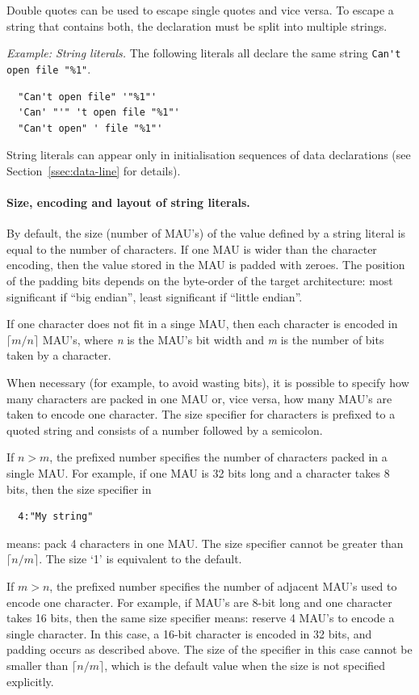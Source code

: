 \documentclass[twoside]{tceusermanual}
\begin{document}
Double quotes can be used to escape single quotes and vice versa. To escape
a string that contains both, the declaration must be split into multiple
strings.

\emph{Example: String literals.}
The following literals all declare the same string 
\verb|Can't open file "%1"|.
%
\begin{verbatim}
  "Can't open file" '"%1"'
  'Can' "'" 't open file "%1"'
  "Can't open" ' file "%1"'
\end{verbatim}

String literals can appear only in initialisation sequences of data
declarations (see Section~\ref{ssec:data-line} for details).

\paragraph{Size, encoding and layout of string literals.}
By default, the size (number of MAU's) of the value defined by a string
literal is equal to the number of characters. If one MAU is wider than the
character encoding, then the value stored in the MAU is padded with zeroes.
The position of the padding bits depends on the byte-order of the target
architecture: most significant if ``big endian'', least significant if
``little endian''.

If one character does not fit in a singe MAU, then each character is encoded
in $\lceil m/n \rceil$ MAU's, where \emph{n} is the MAU's bit width and
\emph{m} is the number of bits taken by a character.

When necessary (for example, to avoid wasting bits), it is possible to
specify how many characters are packed in one MAU or, vice versa, how many
MAU's are taken to encode one character.
%
The size specifier for characters is prefixed to a quoted string and
consists of a number followed by a semicolon.

If $n > m$, the prefixed number specifies the number of characters packed in
a single MAU. For example, if one MAU is 32 bits long and a character takes
8 bits, then the size specifier in
\begin{verbatim}
  4:"My string"
\end{verbatim}
means: pack 4 characters in one MAU. The size specifier cannot be greater
than $\lceil n/m \rceil$. The size `1' is equivalent to the default.

If $m > n$, the prefixed number specifies the number of adjacent MAU's used
to encode one character. For example, if MAU's are 8-bit long and one
character takes 16 bits, then the same size specifier means: reserve 4 MAU's
to encode a single character. In this case, a 16-bit character is encoded in
32 bits, and padding occurs as described above. The size of the specifier in
this case cannot be smaller than $\lceil n/m \rceil$, which is the default
value when the size is not specified explicitly.
\end{document}
